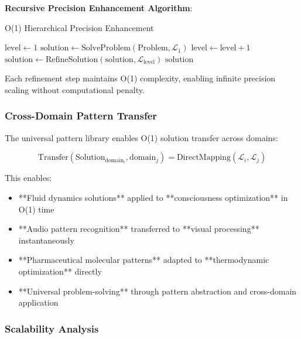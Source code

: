 \documentclass[11pt,a4paper]{article}
\theoremstyle{remark}
\begin{document}
\textbf{Recursive Precision Enhancement Algorithm}:

\begin{algorithm}
\caption{O(1) Hierarchical Precision Enhancement}
\begin{algorithmic}[1]
    \State $\text{level} \leftarrow 1$
    \State $\text{solution} \leftarrow \text{SolveProblem}(\text{Problem}, \mathcal{L}_1)$ 
        \State $\text{level} \leftarrow \text{level} + 1$
        \State $\text{solution} \leftarrow \text{RefineSolution}(\text{solution}, \mathcal{L}_{\text{level}})$ 
    \EndWhile
    \Return $\text{solution}$
\EndProcedure
\end{algorithmic}
\end{algorithm}

Each refinement step maintains O(1) complexity, enabling infinite precision scaling without computational penalty.

\subsubsection{Cross-Domain Pattern Transfer}

The universal pattern library enables O(1) solution transfer across domains:

\begin{equation}
\text{Transfer}(\text{Solution}_{\text{domain}_i}, \text{domain}_j) = \text{DirectMapping}(\mathcal{L}_i, \mathcal{L}_j)
\end{equation}

This enables:
\begin{itemize}
\item **Fluid dynamics solutions** applied to **consciousness optimization** in O(1) time
\item **Audio pattern recognition** transferred to **visual processing** instantaneously  
\item **Pharmaceutical molecular patterns** adapted to **thermodynamic optimization** directly
\item **Universal problem-solving** through pattern abstraction and cross-domain application
\end{itemize}

\subsubsection{Scalability Analysis}
\end{document}
